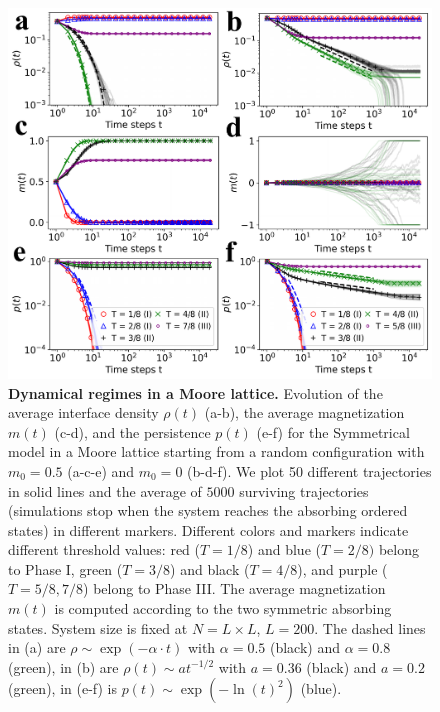 	\begin{figure}
		 \centering
		 \includegraphics[width=\linewidth]{Figs/Aging_STM/FIG10.pdf}
		 \caption{\label{fig:evolution_lattice} \textbf{Dynamical regimes in a Moore lattice.} Evolution of the average interface density $\rho(t)$ (a-b), the average magnetization $m(t)$ (c-d), and the persistence $p(t)$ (e-f) for the Symmetrical model in a Moore lattice starting from a random configuration with $m_0 = 0.5$ (a-c-e) and $m_0 = 0$ (b-d-f). We plot 50 different trajectories in solid lines and the average of $5000$ surviving trajectories (simulations stop when the system reaches the absorbing ordered states) in different markers. Different colors and markers indicate different threshold values: red ($T = 1/8$) and blue ($T = 2/8)$ belong to Phase I, green ($T = 3/8$) and black ($T=4/8$), and purple ($T = 5/8, 7/8$) belong to Phase III. The average magnetization $m(t)$ is computed according to the two symmetric absorbing states. System size is fixed at $N = L \times L$, $L = 200$. The dashed lines in (a) are $\rho \sim \exp(-\alpha \cdot t)$ with $\alpha = 0.5$ (black) and $\alpha = 0.8$ (green), in (b) are $\rho(t) \sim at^{-1/2}$ with $a = 0.36$ (black) and $a = 0.2$ (green), in (e-f) is $p(t) \sim \exp(- \ln(t)^2)$ (blue).
		 }
	\end{figure}
	
